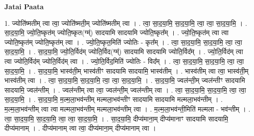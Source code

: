 \documentclass[17pt]{extarticle}
\begin{document}
\textbf{Jatai Paata} \newline

1. ज्योति॑ष्मतीम् त्वा त्वा॒ ज्योति॑ष्मती॒म् ज्योति॑ष्मतीम् त्वा । . त्वा॒ सा॒द॒या॒मि॒ सा॒द॒या॒मि॒ त्वा॒ त्वा॒ सा॒द॒या॒मि॒ । . सा॒द॒या॒मि॒ ज्यो॒ति॒ष्कृत॑म् ज्योति॒ष्कृत(ग्म्॑) सादयामि सादयामि ज्योति॒ष्कृत᳚म् । . ज्यो॒ति॒ष्कृत॑म् त्वा त्वा ज्योति॒ष्कृत॑म् ज्योति॒ष्कृत॑म् त्वा । . ज्यो॒ति॒ष्कृत॒मिति॑ ज्योतिः - कृत᳚म् । . त्वा॒ सा॒द॒या॒मि॒ सा॒द॒या॒मि॒ त्वा॒ त्वा॒ सा॒द॒या॒मि॒ । . सा॒द॒या॒मि॒ ज्यो॒ति॒र्विद॑म् ज्योति॒र्विद(ग्म्॑) सादयामि सादयामि ज्योति॒र्विद᳚म् । . ज्यो॒ति॒र्विद॑म् त्वा त्वा ज्योति॒र्विद॑म् ज्योति॒र्विद॑म् त्वा । . ज्यो॒ति॒र्विद॒मिति॑ ज्योतिः - विद᳚म् । . त्वा॒ सा॒द॒या॒मि॒ सा॒द॒या॒मि॒ त्वा॒ त्वा॒ सा॒द॒या॒मि॒ । . सा॒द॒या॒मि॒ भास्व॑ती॒म् भास्व॑तीꣳ सादयामि सादयामि॒ भास्व॑तीम् । . भास्व॑तीम् त्वा त्वा॒ भास्व॑ती॒म् भास्व॑तीम् त्वा । . त्वा॒ सा॒द॒या॒मि॒ सा॒द॒या॒मि॒ त्वा॒ त्वा॒ सा॒द॒या॒मि॒ । . सा॒द॒या॒मि॒ ज्वल॑न्ती॒म् ज्वल॑न्तीꣳ सादयामि सादयामि॒ ज्वल॑न्तीम् । . ज्वल॑न्तीम् त्वा त्वा॒ ज्वल॑न्ती॒म् ज्वल॑न्तीम् त्वा । . त्वा॒ सा॒द॒या॒मि॒ सा॒द॒या॒मि॒ त्वा॒ त्वा॒ सा॒द॒या॒मि॒ । . सा॒द॒या॒मि॒ म॒ल्म॒ला॒भव॑न्तीम् मल्मला॒भव॑न्तीꣳ सादयामि सादयामि मल्मला॒भव॑न्तीम् । . म॒ल्म॒ला॒भव॑न्तीम् त्वा त्वा मल्मला॒भव॑न्तीम् मल्मला॒भव॑न्तीम् त्वा । . म॒ल्म॒ला॒भव॑न्ती॒मिति॑ मल्मला - भव॑न्तीम् । . त्वा॒ सा॒द॒या॒मि॒ सा॒द॒या॒मि॒ त्वा॒ त्वा॒ सा॒द॒या॒मि॒ । . सा॒द॒या॒मि॒ दीप्य॑माना॒म् दीप्य॑मानाꣳ सादयामि सादयामि॒ दीप्य॑मानाम् । . दीप्य॑मानाम् त्वा त्वा॒ दीप्य॑माना॒म् दीप्य॑मानाम् त्वा । \newline
\end{document}

